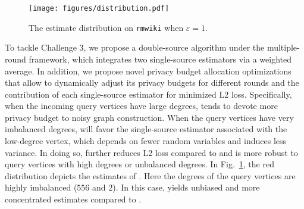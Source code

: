 \begin{figure}[thb]
\centering  
\texttt{[image: figures/distribution.pdf]}
\myspace
\caption{The estimate distribution on \texttt{rmwiki} when $\varepsilon=1$.
}
\myspace
\myspace
\label{fig:distribution}
\end{figure}

To tackle Challenge 3, we propose a double-source algorithm \advds under the multiple-round framework, which integrates two single-source estimators via a weighted average. 
In addition, we propose novel privacy budget allocation optimizations that allow \advds to dynamically adjust its privacy budgets for different rounds and the contribution of each single-source estimator for minimized L2 loss. 
Specifically, when the incoming query vertices have large degrees, \advds tends to devote more privacy budget to noisy graph construction. %
When the query vertices have very imbalanced degrees, \advds will favor the single-source estimator associated with the low-degree vertex, which depends on fewer random variables and induces less variance. 
In doing so, \advds further reduces L2 loss compared to \advss and is more robust to query vertices with high degrees or unbalanced degrees. 
In Fig.~\ref{fig:distribution}, the red distribution depicts the estimates of \advds. 
Here the degrees of the query vertices are highly imbalanced ($556$ and $2$). 
In this case, \advds yields unbiased and more concentrated estimates compared to \advss. 

